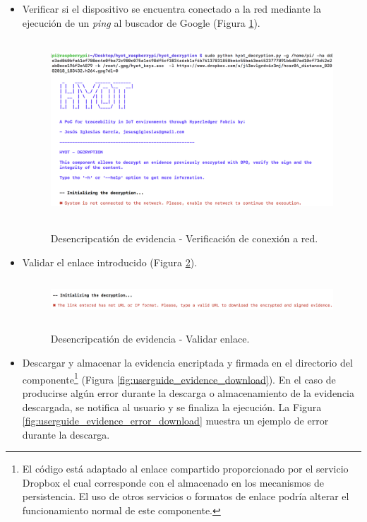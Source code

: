 \documentclass[12pt,a4paper, twoside]{report}
\begin{document}
	\begin{itemize}
		\item Verificar si el dispositivo se encuentra conectado a la red mediante la ejecución de un \textit{ping} al buscador de Google (Figura \ref{fig:userguide_evidence_ping}).
		
			\begin{figure}[!ht]   
				\caption{Desencripcatión de evidencia - Verificación de conexión a red.} 
				\begin{center} 
					\includegraphics[width=16cm,height=6.7cm]{Images/userGuide/evidence/network} \\
					\label{fig:userguide_evidence_ping} 
				\end{center}  
			\end{figure}
		
		\newpage
		
		\item Validar el enlace introducido (Figura \ref{fig:userguide_evidence_link}).
		
			\begin{figure}[!ht]   
				\caption{Desencripcatión de evidencia - Validar enlace.} 
				\begin{center} 
					\includegraphics[width=18cm,height=1.5cm]{Images/userGuide/evidence/invalidLink} \\
					\label{fig:userguide_evidence_link} 
				\end{center}  
			\end{figure}
			
		\item Descargar y almacenar la evidencia encriptada y firmada en el directorio del componente\footnote{El código está adaptado al enlace compartido proporcionado por el servicio Dropbox el cual corresponde con el almacenado en los mecanismos de persistencia. El uso de otros servicios o formatos de enlace podría alterar el funcionamiento normal de este componente.} (Figura \ref{fig:userguide_evidence_download}).	En el caso de producirse algún error durante la descarga o almacenamiento de la evidencia descargada, se notifica al usuario y se finaliza la ejecución. La Figura \ref{fig:userguide_evidence_error_download} muestra un ejemplo de error durante la descarga.
				

\end{itemize}
\end{document}
